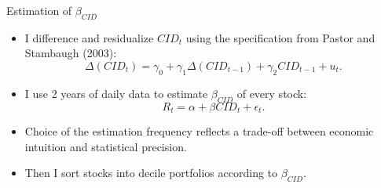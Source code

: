 \documentclass{beamer}
\begin{document}
\begin{frame}{Estimation of $\beta_{CID}$}
\begin{itemize}
    \item {I difference and residualize $CID_t$ using the specification from Pastor and Stambaugh (2003):
    $$\Delta(CID_t) = \gamma_0 + \gamma_1 \Delta(CID_{t-1}) + \gamma_2 CID_{t-1} + u_t.$$}
    \item {I use 2 years of daily data to estimate $\beta_{CID}$ of every stock:
    $$R_{t}=\alpha+\beta CID_t + \epsilon_t.$$}
    \item {Choice of the estimation frequency reflects a trade-off between economic intuition and statistical precision.}
    \item {Then I sort stocks into decile portfolios according to $\beta_{CID}$.}
\end{itemize}
\end{frame}
\end{document}
